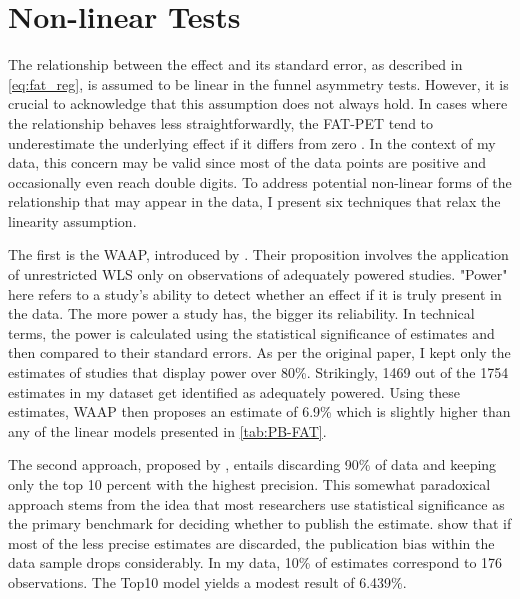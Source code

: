 \begin{table}[!t]
  \end{table}
  


\section{Non-linear Tests}
\label{sec:nonlinear_tests}

The relationship between the effect and its standard error, as described in \autoref{eq:fat_reg}, is assumed to be linear in the funnel asymmetry tests. However, it is crucial to acknowledge that this assumption does not always hold. In cases where the relationship behaves less straightforwardly, the \ac{FAT-PET} tend to underestimate the underlying effect if it differs from zero \citep{stanley2014meta}. In the context of my data, this concern may be valid since most of the data points are positive and occasionally even reach double digits. To address potential non-linear forms of the relationship that may appear in the data, I present six techniques that relax the linearity assumption. 

The first is the \ac{WAAP}, introduced by \cite{Ioannidis2017Waap}. Their proposition involves the application of unrestricted \ac{WLS} only on observations of adequately powered studies. "Power" here refers to a study's ability to detect whether an effect if it is truly present in the data. The more power a study has, the bigger its reliability. In technical terms, the power is calculated using the statistical significance of estimates and then compared to their standard errors. As per the original paper, I kept only the estimates of studies that display power over 80\%. Strikingly, 1469 out of the 1754 estimates in my dataset get identified as adequately powered. Using these estimates, \ac{WAAP} then proposes an estimate of 6.9\% which is slightly higher than any of the linear models presented in \autoref{tab:PB-FAT}.

The second approach, proposed by \cite{Stanley2010Top}, entails discarding 90\% of data and keeping only the top 10 percent with the highest precision. This somewhat paradoxical approach stems from the idea that most researchers use statistical significance as the primary benchmark for deciding whether to publish the estimate. \cite{Stanley2010Top} show that if most of the less precise estimates are discarded, the publication bias within the data sample drops considerably. In my data, 10\% of estimates correspond to 176 observations. The Top10 model yields a modest result of 6.439\%.

